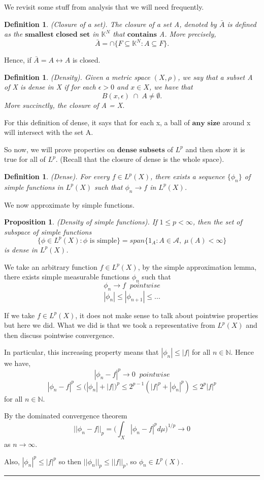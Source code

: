 \documentclass[twoside]{article}
\newtheorem{proposition}[theorem]{Proposition}
\newtheorem{definition}[theorem]{Definition}
\newenvironment{proof}{{\bf Proof:}}{\hfill\rule{2mm}{2mm}}
\begin{document}
We revisit some stuff from analysis that we will need frequently.
\begin{definition}(Closure of a set). The closure of a set A, denoted by $\bar{A}$ is defined as the $\textbf{smallest closed set}$ in $\mathbb{K}^N$ that $\textbf{contains}$ A. More precisely,
$$
\bar{A} = \cap\{F \subseteq \mathbb{K}^N: A \subseteq F\}.
$$
\end{definition}

Hence, if $\bar{A} = A \leftrightarrow A$ is closed.

\begin{definition}(Density). Given a metric space $(X, \rho)$, we say that a subset A of X is dense in X if for each $\epsilon > 0$ and $x \in X$, we have that
$$
B(x, \epsilon) \;\cap \; A \neq \emptyset.
$$
More succinctly, the closure of A = X.
\end{definition}

For this definition of dense, it says that for each x, a ball of $\textbf{any size}$ around x will intersect with the set A.

So now, we will prove properties on $\textbf{dense subsets}$ of $L^p$ and then show it is true for all of $L^p$. (Recall that the closure of dense is the whole space).

\begin{definition}(Dense). For every $f \in L^p(X)$, there exists a sequence $\{\phi_n\}$ of simple functions in $L^p(X)$ such that $\phi_n \rightarrow f$ in $L^p(X)$.
\end{definition}

We now approximate by simple functions.

\begin{proposition}(Density of simple functions). If $1 \leq p < \infty$, then the set of subspace of simple functions
$$
\{\phi \in L^p(X): \phi \text{ is simple}\} = span\{1_A: A \in \mathcal{A}, \;\mu(A) < \infty\}
$$
is dense in $L^p(X)$.
\end{proposition}

\begin{proof}  We take an arbitrary function $f \in L^p(X)$, by the simple approximation lemma, there exists simple measurable functions $\phi_n$ such that
$$
\phi_n \rightarrow f \;\; pointwise
$$
$$
|\phi_n| \leq |\phi_{n+1}| \leq ...
$$

If we take $f \in L^p(X)$, it does not make sense to talk about pointwise properties but here we did. What we did is that we took a representative from $L^p(X)$ and then discuss pointwise convergence.

In particular, this increasing property means that $|\phi_n| \leq |f|$ for all $n \in \mathbb{N}$. Hence we have, 
$$
|\phi_n - f|^p \rightarrow 0 \;\; pointwise
$$
$$
|\phi_n - f|^p \leq \big(|\phi_n| + |f| \big)^p \leq 2^{p-1}(|f|^p + |\phi_n|^p) \leq 2^p|f|^p
$$
for all $n \in \mathbb{N}$.

By the dominated convergence theorem
$$
||\phi_n - f||_p = \big(\int_X|\phi_n - f|^pd\mu\big)^{1/p} \rightarrow 0
$$
as $n \rightarrow \infty$.

Also, $|\phi_n|^p \leq |f|^p$ so then $||\phi_n||_p \leq ||f||_p$, so $\phi_n \in L^p(X)$.
\end{proof}
\end{document}
